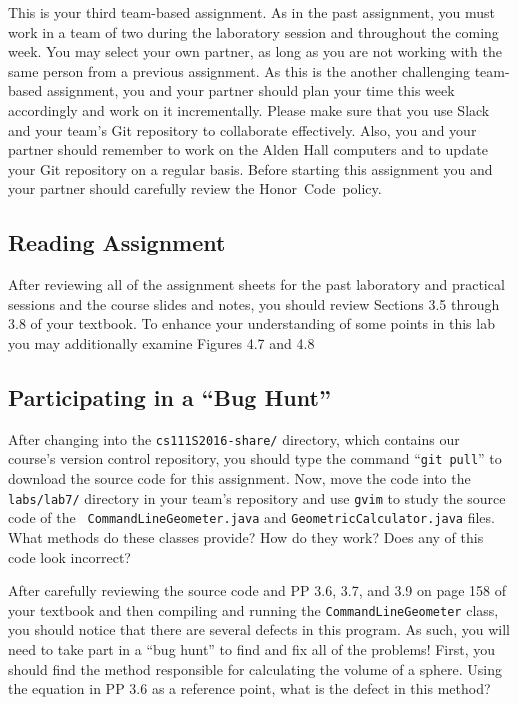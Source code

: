 

This is your third team-based assignment. As in the past assignment, you must work in a team of two during the
laboratory session and throughout the coming week. You may select your own partner, as long as you are not working with
the same person from a previous assignment.  As this is the another challenging team-based assignment, you and your
partner should plan your time this week accordingly and work on it incrementally. Please make sure that you use Slack
and your team's Git repository to collaborate effectively.  Also, you and your partner should remember to work on the
Alden Hall computers and to update your Git repository on a regular basis. Before starting this assignment you and your
partner should carefully review the \mbox{Honor Code policy}.

\vspace*{-.1in}
\subsection*{Reading Assignment}

After reviewing all of the assignment sheets for the past laboratory and practical sessions and the course slides and
notes, you should review Sections 3.5 through 3.8 of your textbook. To enhance your understanding of some points in
this lab you may additionally examine Figures 4.7 and 4.8

\vspace*{-.1in}
\subsection*{Participating in a ``Bug Hunt''}

After changing into the {\tt cs111S2016-share/} directory, which contains our course's version control repository, you
should type the command ``{\tt git pull}'' to download the source code for this assignment. Now, move the code into the
{\tt labs/lab7/} directory in your team's repository and use {\tt gvim} to study the source code of the {\tt
CommandLineGeometer.java} and {\tt GeometricCalculator.java} files. What methods do these classes provide? How do they
work? Does any of this code look incorrect?

After carefully reviewing the source code and PP 3.6, 3.7, and 3.9 on page 158 of your textbook and then compiling and
running the {\tt CommandLineGeometer} class, you should notice that there are several defects in this program. As
such, you will need to take part in a ``bug hunt'' to find and fix all of the problems! First, you should find the
method responsible for calculating the volume of a sphere. Using the equation in PP 3.6 as a reference point, what is
the defect in this method?


